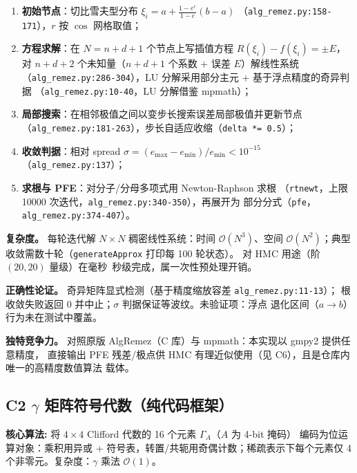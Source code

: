 \documentclass[UTF8]{ctexart}
\begin{document}
\begin{enumerate}
\item \textbf{初始节点}：切比雪夫型分布 $\xi_i = a + \tfrac{1-e^r}{1-e} (b-a)$
（\texttt{alg\_remez.py:158-171}），$r$ 按 $\cos$ 网格取值；
\item \textbf{方程求解}：在 $N=n+d+1$ 个节点上写插值方程 $R(\xi_i) - f(\xi_i) = \pm E$，
对 $n+d+2$ 个未知量（$n+d+1$ 个系数 + 误差 $E$）解线性系统
（\texttt{alg\_remez.py:286-304}），LU 分解采用部分主元 + 基于浮点精度的奇异判据
（\texttt{alg\_remez.py:10-40}，LU 分解借鉴 mpmath）；
\item \textbf{局部搜索}：在相邻极值之间以变步长搜索误差局部极值并更新节点
（\texttt{alg\_remez.py:181-263}），步长自适应收缩（\texttt{delta *= 0.5}）；
\item \textbf{收敛判据}：相对 spread $\sigma = (e_{\max}-e_{\min})/e_{\min} < 10^{-15}$
（\texttt{alg\_remez.py:137}）；
\item \textbf{求根与 PFE}：对分子/分母多项式用 Newton-Raphson 求根
（\texttt{rtnewt}，上限 10000 次迭代，\texttt{alg\_remez.py:340-350}），再展开为
部分分式（\texttt{pfe}，\texttt{alg\_remez.py:374-407}）。
\end{enumerate}

\textbf{复杂度。} 每轮迭代解 $N\times N$ 稠密线性系统：时间 $\mathcal{O}(N^3)$、空间
$\mathcal{O}(N^2)$；典型收敛需数十轮（\texttt{generateApprox} 打印每 100 轮状态）。
对 HMC 用途（阶 $(20,20)$ 量级）在毫秒~秒级完成，属一次性预处理开销。

\textbf{正确性论证。} 奇异矩阵显式检测（基于精度缩放容差 \texttt{alg\_remez.py:11-13}）；
根收敛失败返回 0 并中止；$\sigma$ 判据保证等波纹。\textcolor{warn}{未验证}项：浮点
退化区间（$a\to b$）行为未在测试中覆盖。

\textbf{独特竞争力。} 对照原版 AlgRemez（C 库）与 mpmath：本实现以 gmpy2 提供任意精度，
直接输出 PFE 残差/极点供 HMC 有理近似使用（见 C6），且是仓库内唯一的高精度数值算法
载体。

\subsection{C2 $\gamma$ 矩阵符号代数（纯代码框架）}

\begin{algobox}
\textbf{核心算法:} 将 $4\times4$ Clifford 代数的 16 个元素 $\Gamma_A$（$A$ 为 4-bit 掩码）
编码为位运算对象：乘积用异或 + 符号表，转置/共轭用奇偶计数；稀疏表示下每个元素仅
4 个非零元。复杂度：$\gamma$ 乘法 $\mathcal{O}(1)$。
\end{algobox}
\end{document}

